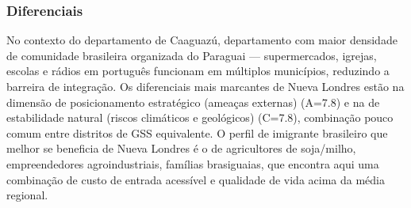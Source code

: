 \subsubsection*{Diferenciais}\label{dif-nueva-londres-0508}
No contexto do departamento de Caaguazú, departamento com maior densidade de comunidade brasileira organizada do Paraguai — supermercados, igrejas, escolas e rádios em português funcionam em múltiplos municípios, reduzindo a barreira de integração. Os diferenciais mais marcantes de Nueva Londres estão na dimensão de posicionamento estratégico (ameaças externas) (A=7.8) e na de estabilidade natural (riscos climáticos e geológicos) (C=7.8), combinação pouco comum entre distritos de GSS equivalente. O perfil de imigrante brasileiro que melhor se beneficia de Nueva Londres é o de agricultores de soja/milho, empreendedores agroindustriais, famílias brasiguaias, que encontra aqui uma combinação de custo de entrada acessível e qualidade de vida acima da média regional.
